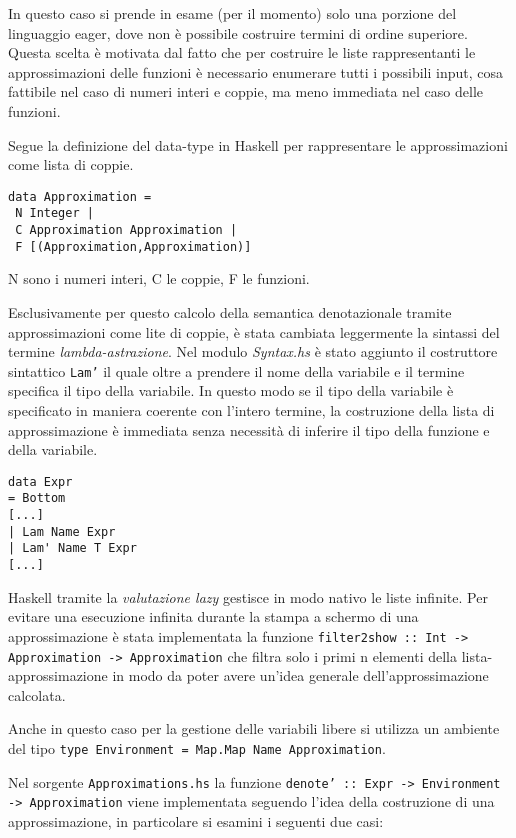 \documentclass{article}
\begin{document}
In questo caso si prende in esame (per il momento) solo una porzione del linguaggio eager, dove non è possibile costruire termini di ordine superiore. Questa scelta è motivata dal fatto che per costruire le liste rappresentanti le approssimazioni delle funzioni è necessario enumerare tutti i possibili input, cosa fattibile nel caso di numeri interi e coppie, ma meno immediata nel caso delle funzioni.

Segue la definizione del data-type in Haskell per rappresentare le approssimazioni come lista di coppie.

\begin{verbatim}
data Approximation = 
 N Integer |
 C Approximation Approximation |
 F [(Approximation,Approximation)]
\end{verbatim}

N sono i numeri interi, C le coppie, F le funzioni.

Esclusivamente per questo calcolo della semantica denotazionale tramite approssimazioni come lite di coppie, è stata cambiata leggermente la sintassi del termine \emph{lambda-astrazione}. Nel modulo \emph{Syntax.hs} è stato aggiunto il costruttore sintattico \texttt{Lam'} il quale oltre a prendere il nome della variabile e il termine specifica il tipo della variabile. In questo modo se il tipo della variabile è specificato in maniera coerente con l'intero termine, la costruzione della lista di approssimazione è immediata senza necessità di inferire il tipo della funzione e della variabile.

\begin{verbatim}
data Expr
= Bottom
[...]
| Lam Name Expr
| Lam' Name T Expr
[...]
\end{verbatim}

Haskell tramite la \emph{valutazione lazy} gestisce in modo nativo le liste infinite.
Per evitare una esecuzione infinita durante la stampa a schermo di una approssimazione è stata implementata la funzione \texttt{filter2show :: Int -> Approximation -> Approximation} che filtra solo i primi n elementi della lista-approssimazione in modo da poter avere un'idea generale dell'approssimazione calcolata.

Anche in questo caso per la gestione delle variabili libere si utilizza un ambiente del tipo \texttt{type Environment = Map.Map Name Approximation}.

Nel sorgente \texttt{Approximations.hs} la funzione \texttt{denote' :: Expr -> Environment -> Approximation} viene implementata seguendo l'idea della costruzione di una approssimazione, in particolare si esamini i seguenti due casi:
\end{document}
